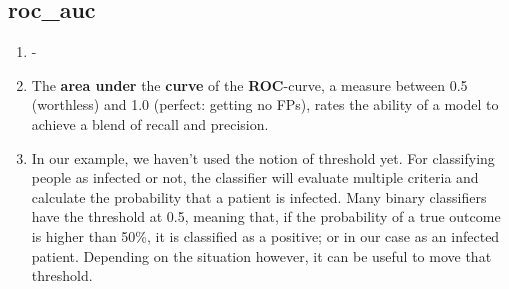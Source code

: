 \documentclass[12pt,a4paper]{article}
\begin{document}
\subsection{roc\_auc}
\begin{enumerate}
\item -
\item The \textbf{area under} the \textbf{curve} of the \textbf{ROC}-curve, a measure between 0.5 (worthless) and 1.0 (perfect: getting no FPs), rates the ability of a model to achieve a blend of recall and precision.
\item In our example, we haven't used the notion of threshold yet. For classifying people as infected or not, the classifier will evaluate multiple criteria and calculate the probability that a patient is infected. Many binary classifiers have the threshold at 0.5, meaning that, if the probability of a true outcome is higher than 50\%, it is classified as a positive; or in our case as an infected patient. Depending on the situation however, it can be useful to move that threshold.
\end{enumerate}
\end{document}
